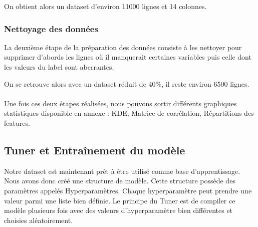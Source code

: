 On obtient alors un dataset d'environ 11000 lignes et 14 colonnes.

\subsubsection{Nettoyage des données}

La deuxième étape de la préparation des données consiste à les nettoyer pour supprimer d'abords les lignes où il manquerait certaines variables puis celle dont les valeurs du label sont aberrantes.

On se retrouve alors avec un dataset réduit de 40\%, il reste environ 6500 lignes.

\paragraph{}


Une fois ces deux étapes réalisées, nous pouvons sortir différents graphiques statistiques disponible en annexe : KDE, Matrice de corrélation, Répartitions des features.


\subsection{Tuner et Entraînement du modèle}

Notre dataset est maintenant prêt à être utilisé comme base d'apprentissage. Nous avons donc créé une structure de modèle. Cette structure possède des paramètres appelés Hyperparamètres. Chaque hyperparamètre peut prendre une valeur parmi une liste bien définie. Le principe du Tuner est de compiler ce modèle plusieurs fois avec des valeurs d'hyperparamètre bien différentes et choisies aléatoirement.

